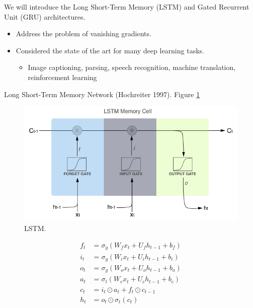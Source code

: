 \documentclass[english]{article}
\begin{document}
We will introduce the Long Short-Term Memory (LSTM) and Gated Recurrent Unit (GRU) architectures. 
\begin{itemize}
\item Address the problem of vanishing gradients.
\item Considered the state of the art for many deep learning tasks.
\begin{itemize}
\item Image captioning, parsing, speech recognition, machine translation, reinforcement learning
\end{itemize}
\end{itemize}
 

\item 
 {Long Short-Term Memory Network (Hochreiter 1997)}.  Figure \ref{LSTM}

\begin{figure}
\centering
\includegraphics[height=0.33\linewidth]{lstm-cell.png}
    \caption{LSTM.}
    \label{LSTM}
\end{figure}

\begin{align*}
f_t &= \sigma_g(W_fx_t+U_fh_{t-1}+b_f)\\
i_t &= \sigma_g(W_ix_t+U_ih_{t-1}+b_i)\\
o_t &= \sigma_g(W_ox_t+U_oh_{t-1}+b_o)\\
a_t &= \sigma_t(W_cx_t+U_ch_{t-1}+b_c)\\
c_t &= i_t\odot a_t +f_t\odot c_{t-1}\\
h_t &= o_t\odot \sigma_t(c_t)
\end{align*}
 
\end{document}

